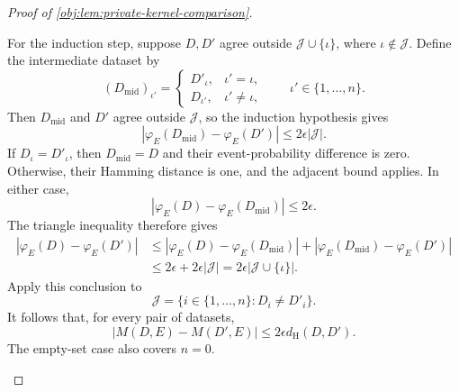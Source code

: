 \documentclass[11pt]{article}
\begin{document}
\begin{proof}[Proof of \cref{obj:lem:private-kernel-comparison}]
\begin{enumerate}
For the induction step, suppose \(D,D'\) agree outside
\(\mathcal J\cup\{\iota\}\), where \(\iota\notin\mathcal J\). Define the intermediate dataset by
\[
(D_{\mathrm{mid}})_{\iota'}
=
\begin{cases}
D'_\iota,&\iota'=\iota,\\
D_{\iota'},&\iota'\ne\iota,
\end{cases}
\qquad \iota'\in\{1,\ldots,n\}.
\]
Then \(D_{\mathrm{mid}}\) and \(D'\) agree outside \(\mathcal J\), so the induction hypothesis gives
\[
|\varphi_E(D_{\mathrm{mid}})-\varphi_E(D')|
\le2\epsilon|\mathcal J|.
\]
If \(D_\iota=D'_\iota\), then \(D_{\mathrm{mid}}=D\) and their event-probability difference is zero. Otherwise, their Hamming distance is one, and the adjacent bound applies. In either case,
\[
|\varphi_E(D)-\varphi_E(D_{\mathrm{mid}})|\le2\epsilon.
\]
The triangle inequality therefore gives
\[
\begin{aligned}
|\varphi_E(D)-\varphi_E(D')|
&\le
|\varphi_E(D)-\varphi_E(D_{\mathrm{mid}})|
+
|\varphi_E(D_{\mathrm{mid}})-\varphi_E(D')|\\
&\le2\epsilon+2\epsilon|\mathcal J|
=2\epsilon|\mathcal J\cup\{\iota\}|.
\end{aligned}
\]
Apply this conclusion to
\[
\mathcal J=\{i\in\{1,\ldots,n\}:D_i\ne D'_i\}.
\]
It follows that, for every pair of datasets,
\[
|M(D,E)-M(D',E)|
\le2\epsilon d_{\mathrm H}(D,D').
\]
The empty-set case also covers \(n=0\).


\end{enumerate}
\end{proof}
\end{document}
